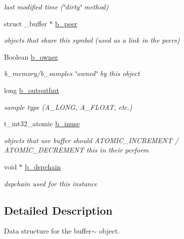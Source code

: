 \begin{DoxyCompactItemize}
\begin{DoxyCompactList}\small\item\em last modified time (\char`\"{}dirty\char`\"{} method) \item\end{DoxyCompactList}\item 
\hypertarget{structt__buffer_af548887b07ecbe56ec0cb1bb1b6ec178}{
struct \_\-buffer $\ast$ \hyperlink{structt__buffer_af548887b07ecbe56ec0cb1bb1b6ec178}{b\_\-peer}}
\label{structt__buffer_af548887b07ecbe56ec0cb1bb1b6ec178}

\begin{DoxyCompactList}\small\item\em objects that share this symbol (used as a link in the peers) \item\end{DoxyCompactList}\item 
\hypertarget{structt__buffer_af21398b09f90ab2dc395f032f4a6a6be}{
Boolean \hyperlink{structt__buffer_af21398b09f90ab2dc395f032f4a6a6be}{b\_\-owner}}
\label{structt__buffer_af21398b09f90ab2dc395f032f4a6a6be}

\begin{DoxyCompactList}\small\item\em b\_\-memory/b\_\-samples \char`\"{}owned\char`\"{} by this object \item\end{DoxyCompactList}\item 
\hypertarget{structt__buffer_a99862e5daf5af41ec7295ae82f1cc90d}{
long \hyperlink{structt__buffer_a99862e5daf5af41ec7295ae82f1cc90d}{b\_\-outputfmt}}
\label{structt__buffer_a99862e5daf5af41ec7295ae82f1cc90d}

\begin{DoxyCompactList}\small\item\em sample type (A\_\-LONG, A\_\-FLOAT, etc.) \item\end{DoxyCompactList}\item 
\hypertarget{structt__buffer_a8b73229209b37b22a3baeadb57619699}{
t\_\-int32\_\-atomic \hyperlink{structt__buffer_a8b73229209b37b22a3baeadb57619699}{b\_\-inuse}}
\label{structt__buffer_a8b73229209b37b22a3baeadb57619699}

\begin{DoxyCompactList}\small\item\em objects that use buffer should ATOMIC\_\-INCREMENT / ATOMIC\_\-DECREMENT this in their perform \item\end{DoxyCompactList}\item 
\hypertarget{structt__buffer_a7e49d1b985c70b8e991021e34c07085a}{
void $\ast$ \hyperlink{structt__buffer_a7e49d1b985c70b8e991021e34c07085a}{b\_\-dspchain}}
\label{structt__buffer_a7e49d1b985c70b8e991021e34c07085a}

\begin{DoxyCompactList}\small\item\em dspchain used for this instance \item\end{DoxyCompactList}\end{DoxyCompactItemize}


\subsection{Detailed Description}
Data structure for the buffer$\sim$ object. 